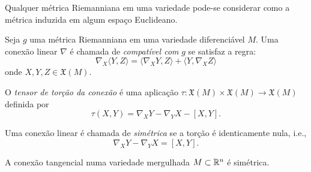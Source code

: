 \begin{teorema}
	Qualquer métrica Riemanniana em uma variedade pode-se considerar como a métrica induzida em algum espaço Euclideano.
\end{teorema}

\begin{definicao}
	Seja $g$ uma métrica Riemanniana em uma variedade diferenciável $M$. Uma conexão linear $\nabla$ é chamada de \emph{compatível com} $g$ se satisfaz a regra:
	\begin{equation*}
		\nabla_X \langle Y,Z \rangle = \langle \nabla_X Y, Z \rangle + \langle Y, \nabla_X Z \rangle
	\end{equation*}
	onde $X,Y,Z \in \mathfrak{X}(M)$.
\end{definicao}

\begin{definicao}
	O \emph{tensor de torção da conexão} é uma aplicação $\tau: \mathfrak{X}(M) \times \mathfrak{X}(M) \rightarrow \mathfrak{X}(M)$ definida por
	\begin{equation*}
		\tau(X,Y) = \nabla_X Y - \nabla_Y X - [X,Y].
	\end{equation*}
\end{definicao}

\begin{definicao}
	Uma conexão linear é chamada de \emph{simétrica} se a torção é identicamente nula, i.e.,
	\begin{equation*}
		\nabla_X Y - \nabla_Y X = [X,Y].
	\end{equation*}
\end{definicao}

\begin{lema}
	A conexão tangencial numa variedade mergulhada $M \subset \mathbb{R}^n$ é simétrica.
\end{lema}


